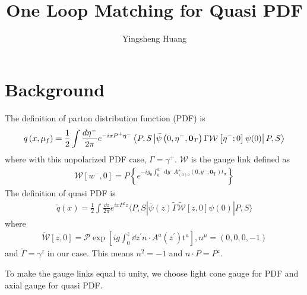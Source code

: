 \documentclass{article}
\title{One Loop Matching for Quasi PDF}
\author{Yingsheng Huang}
\begin{document}
\maketitle
\clearpage
\section{Background}
The definition of parton distribution function (PDF) is
\begin{align}
	q\left(x, \mu_{f}\right)=\frac{1}{2} \int \frac{d \eta^{-}}{2 \pi} e^{-i x P^{+} \eta^{-}}\left\langle P, S\left|\bar{\psi}\left(0,\eta^{-},\vb{0}_{T}\right) \Gamma \mathcal{W}\left[\eta^{-} ; 0\right] \psi(0)\right| P, S\right\rangle
\end{align}
where with this unpolarized PDF case, $\Gamma=\gamma^+$. $\mathcal{W}$ is the gauge link defined as\cite{Collins2009}
\begin{align}
	\mathcal{W}\left[w^{-}, 0\right]=P\left\{e^{-i g_{0} \int_{0}^{w^{-}} \mathrm{d} y^{-} A_{(0) \sigma}^{+}\left(0, y^{-}, \boldsymbol{0}_{\mathrm{T}}\right) t_{\sigma}}\right\}
\end{align}
The definition of quasi PDF is
\begin{align}
	\tilde{q}(x)=\frac{1}{2} \int \frac{\dd z}{2 \pi} e^{i x P^{z} z}\langle P, S|\bar{\psi}(z) \tilde{\Gamma} \tilde{\mathcal{W}}[z, 0] \psi(0)| P, S\rangle
\end{align}
where
\begin{align}
	\tilde{\mathcal{W}}\left[z, 0\right]=\mathcal{P} \exp \left[i g \int_{0}^{z} \dd z^{\prime} n \cdot A^{a}\left(z^{\prime}\right) \mathrm{t}^{a}\right], n^\mu=(0,0,0,-1)
\end{align}
and $\tilde{\Gamma}=\gamma^z$ in our case. This means $n^2=-1$ and $n\cdot P=P^z$. 

To make the gauge links equal to unity, we choose light cone gauge for PDF and axial gauge for quasi PDF.

\clearpage
\end{document}
